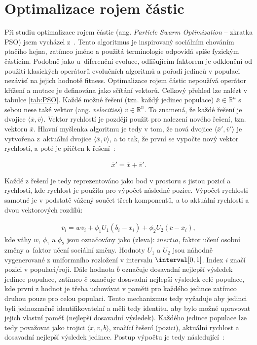 
\section{Optimalizace rojem částic}
Při studiu optimalizace rojem částic (ang. \emph{Particle Swarm Optimization} -- zkratka PSO) jsem vycházel z~\cite{PSO_GA_TSP, introductionEvo}. Tento algoritmus je inspirovaný sociálním chováním ptačího hejna, zatímco jméno a použitá terminologie odpovídá spíše fyzickým částicím. Podobně jako u~diferenční evoluce, odlišujícím faktorem je odklonění od použití klasických operátorů evolučních algoritmů a pořadí jedinců v populaci nezávisí na jejich hodnotě fitness. Optimalizace rojem částic nepoužívá operátor křížení a mutace je definována jako sčítání vektorů. Celkový přehled lze nalézt v tabulce \ref{tab:PSO}. Každé možné řešení (tzn. každý jedinec populace) $\bar{x} \in \mathbb{R}^{n}$ s sebou nese také vektor  (ang. \emph{velocities}) $\bar{v} \in \mathbb{R}^{n}$. To znamená, že každé řešení je dvojice $\langle \bar{x}, \bar{v} \rangle$. Vektor rychlostí je později použit pro nalezení nového řešení, tzn. vektoru $\bar{x}$. Hlavní myšlenka algoritmu je tedy v tom, že nová dvojice $\langle \bar{x}', \bar{v}' \rangle$ je vytvořena z~aktuální dvojice $\langle \bar{x}, \bar{v} \rangle$, a to tak, že první se vypočte nový vektor rychlostí, a poté je přičten k řešení~\cite{introductionEvo}:

\begin{align}
    \label{eq:PSO1}
    \bar{x}' = \bar{x} + \bar{v}'.
\end{align}

Každé z řešení je tedy reprezentováno jako bod v prostoru s jistou pozicí a rychlostí, kde rychlost je použita pro výpočet následné pozice. Výpočet rychlosti samotné je v podstatě vážený součet třech komponentů, a to aktuální rychlosti a dvou vektorových rozdílů:

\begin{align}
    \label{eq:PSO2}
    \bar{v}_i = w \bar{v}_i + \phi_1 U_1 (\bar{b}_i - \bar{x}_i) + \phi_2 U_2 (\bar{c} - \bar{x}_i),
\end{align}
kde váhy $w$, $\phi_1$ a $\phi_2$ jsou označovány jako (zleva): $inertia$, faktor učení osobní změny a~faktor učení sociální změny. Hodnoty $U_1$ a $U_2$ jsou náhodně vygenerované z uniformního rozložení v intervalu $\interval[{0,1}]$. Index $i$ značí pozici v populaci/roji. Dále hodnota $\bar{b}$ označuje dosavadní nejlepší výsledek jedince populace, zatímco $\bar{c}$ označuje dosavadní nejlepší výsledek celé populace, kde první z hodnot je třeba uchovávat v paměti pro každého jedince zatímco druhou pouze pro celou populaci. Tento mechanizmus tedy vyžaduje aby jedinci byli jednoznačně identifikovatelní a měli tedy identitu, aby bylo možné upravovat jejich vlastní paměť (nejlepší dosavadní výsledek). Každého jedince populace lze tedy považovat jako trojici $\langle \bar{x}, \bar{v}, \bar{b} \rangle$, značící řešení (pozici), aktuální rychlost a dosavadní nejlepší výsledek jedince. Postup výpočtu je tedy následující~\cite{PSO_GA_TSP, introductionEvo}:

